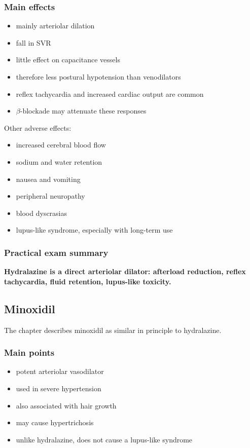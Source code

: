 \documentclass[11pt,a4paper]{article}
\begin{document}
\subsubsection*{Main effects}
\begin{itemize}
    \item mainly arteriolar dilation
    \item fall in SVR
    \item little effect on capacitance vessels
    \item therefore less postural hypotension than venodilators
    \item reflex tachycardia and increased cardiac output are common
    \item $\beta$-blockade may attenuate these responses
\end{itemize}

Other adverse effects:
\begin{itemize}
    \item increased cerebral blood flow
    \item sodium and water retention
    \item nausea and vomiting
    \item peripheral neuropathy
    \item blood dyscrasias
    \item lupus-like syndrome, especially with long-term use
\end{itemize}

\subsubsection*{Practical exam summary}

\textbf{Hydralazine is a direct arteriolar dilator: afterload reduction, reflex tachycardia, fluid retention, lupus-like toxicity.}

\subsection{Minoxidil}

The chapter describes minoxidil as similar in principle to hydralazine.

\subsubsection*{Main points}
\begin{itemize}
    \item potent arteriolar vasodilator
    \item used in severe hypertension
    \item also associated with hair growth
    \item may cause hypertrichosis
    \item unlike hydralazine, does not cause a lupus-like syndrome
\end{itemize}
\end{document}
